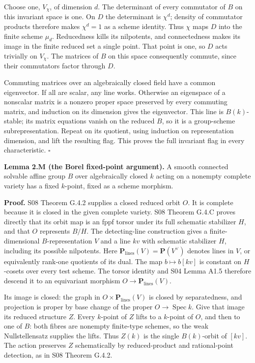 \documentclass[11pt,a4paper,openany]{report}
\newcounter{none}
\begin{document}
Choose one, \(V_\chi\), of dimension \(d\). The determinant of every commutator of \(B\) on this invariant space is one. On \(D\) the determinant is \(\chi^d\); density of commutator products therefore makes \(\chi^d=1\) as a scheme identity. Thus \(\chi\) maps \(D\) into the finite scheme \(\mu_d\). Reducedness kills its nilpotents, and connectedness makes its image in the finite reduced set a single point. That point is one, so \(D\) acts trivially on \(V_\chi\). The matrices of \(B\) on this space consequently commute, since their commutators factor through \(D\).

Commuting matrices over an algebraically closed field have a common eigenvector. If all are scalar, any line works. Otherwise an eigenspace of a nonscalar matrix is a nonzero proper space preserved by every commuting matrix, and induction on its dimension gives the eigenvector. This line is \(B(k)\)-stable; its matrix equations vanish on the reduced \(B\), so it is a group-scheme subrepresentation. Repeat on its quotient, using induction on representation dimension, and lift the resulting flag. This proves the full invariant flag in every characteristic. \(\square\)

\textbf{Lemma 2.M (the Borel fixed-point argument).} A smooth connected solvable affine group \(B\) over algebraically closed \(k\) acting on a nonempty complete variety has a fixed \(k\)-point, fixed as a scheme morphism.

\textbf{Proof.} S08 Theorem G.4.2 supplies a closed reduced orbit \(O\). It is complete because it is closed in the given complete variety. S08 Theorem G.4.C proves directly that its orbit map is an fppf torsor under its full schematic stabilizer \(H\), and that \(O\) represents \(B/H\). The detecting-line construction gives a finite-dimensional \(B\)-representation \(V\) and a line \(kv\) with schematic stabilizer \(H\), including its possible nilpotents. Here \(\mathbf P_{\mathrm{lines}}(V)=\mathbf P(V^\vee)\) denotes lines in \(V\), or equivalently rank-one quotients of its dual. The map \(b\mapsto b[kv]\) is constant on \(H\)-cosets over every test scheme. The torsor identity and S04 Lemma A1.5 therefore descend it to an equivariant morphism \(O\to\mathbf P_{\mathrm{lines}}(V)\).

Its image is closed: the graph in \(O\times\mathbf P_{\mathrm{lines}}(V)\) is closed by separatedness, and projection is proper by base change of the proper \(O\to\operatorname{Spec}k\). Give that image its reduced structure \(Z\). Every \(k\)-point of \(Z\) lifts to a \(k\)-point of \(O\), and then to one of \(B\): both fibres are nonempty finite-type schemes, so the weak Nullstellensatz supplies the lifts. Thus \(Z(k)\) is the single \(B(k)\)-orbit of \([kv]\). The action preserves \(Z\) schematically by reduced-product and rational-point detection, as in S08 Theorem G.4.2.
\end{document}
